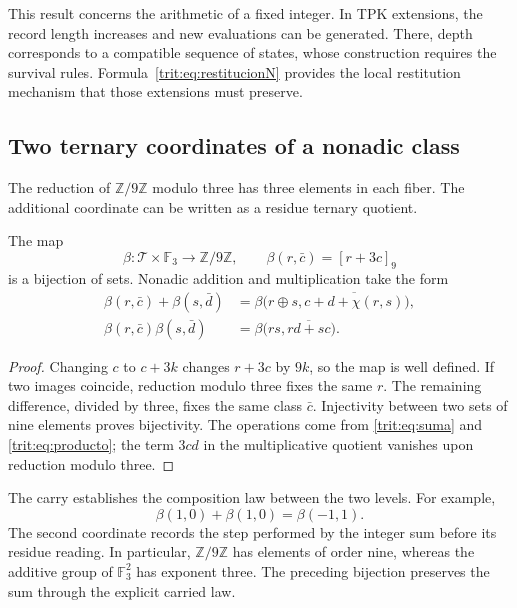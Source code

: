 This result concerns the arithmetic of a fixed integer. In
TPK extensions, the record length increases and new
evaluations can be generated. There, depth corresponds to a compatible
sequence of states, whose construction requires the survival
rules. Formula~\eqref{trit:eq:restitucionN} provides the local
restitution mechanism that those extensions must preserve.

\subsection{Two ternary coordinates of a nonadic class}
\label{trit:nonadico}

The reduction of \(\mathbb Z/9\mathbb Z\) modulo three has three elements
in each fiber. The additional coordinate can be written as a residue
ternary quotient.

\begin{proposicion}
\label{trit:prop:beta}
The map
\[
 \beta:\mathcal T\times\mathbb F_3\longrightarrow\mathbb Z/9\mathbb Z,
 \qquad \beta(r,\bar c)=[r+3c]_9
\]
is a bijection of sets. Nonadic addition and multiplication take the
form
\begin{align}
 \beta(r,\bar c)+\beta(s,\bar d)
 &=\beta\bigl(r\oplus s,\overline{c+d+\chi(r,s)}\bigr),
 \label{trit:eq:beta-suma}\\
 \beta(r,\bar c)\beta(s,\bar d)
 &=\beta\bigl(rs,\overline{rd+sc}\bigr).
 \label{trit:eq:beta-producto}
\end{align}
\end{proposicion}
\begin{proof}
Changing \(c\) to \(c+3k\) changes \(r+3c\) by \(9k\), so
the map is well defined. If two images coincide, reduction
modulo three fixes the same \(r\). The remaining difference, divided by
three, fixes the same class \(\bar c\). Injectivity between two sets
of nine elements proves bijectivity. The operations come from
\eqref{trit:eq:suma} and \eqref{trit:eq:producto}; the term \(3cd\) in the
multiplicative quotient vanishes upon reduction modulo three.
\end{proof}

The carry establishes the composition law between the two levels. For
example,
\[
 \beta(1,0)+\beta(1,0)=\beta(-1,1).
\]
The second coordinate records the step performed by the integer sum before
its residue reading. In particular, \(\mathbb Z/9\mathbb Z\) has
elements of order nine, whereas the additive group of
\(\mathbb F_3^2\) has exponent three. The preceding bijection preserves
the sum through the explicit carried law.

